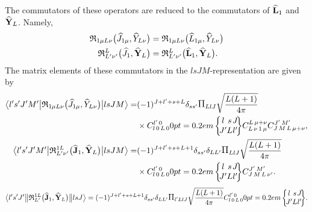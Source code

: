 The commutators of these operators are reduced to the commutators of \(\widehat{\mathbf{L}}_{1}\) and \(\widehat{\mathbf{Y}}_{L}\). Namely,
\begin{align*}
\mathfrak{R}_{1 \mu L \nu}\bigl(\widehat{J}_{1 \mu}, \widehat{Y}_{L \nu}\bigr) & =\mathfrak{R}_{1 \mu L \nu}\bigl(\widehat{L}_{1 \mu}, \widehat{Y}_{L \nu}\bigr) \\
\mathfrak{R}_{L^{\prime} \nu^{\prime}}^{L}\bigl(\widehat{J}_{1}, \widehat{\mathbf{Y}}_{L}\bigr) & =\mathfrak{R}_{L^{\prime} \nu^{\prime}}^{L}\bigl(\widehat{\mathbf{L}}_{1}, \widehat{\mathbf{Y}}_{L}\bigr).
\end{align*}
The matrix elements of these commutators in the $lsJM$-representation are given by
\begin{align}
\braOket{ l^{\prime} s^{\prime} J^{\prime} M^{\prime}}{ \mathfrak{R}_{1 \mu L \nu}\bigl(\widehat{J}_{1 \mu}, \widehat{Y}_{L \nu}\bigr)}{l s J M}=&(-1)^{J+l^{\prime}+s+L} \delta_{s s^{\prime}} \Fact{L l J}\sqrt{\frac{L(L+1)}{4 \pi}}\notag \\
&\times
\clebsch{l}{0}{L}{0}{l^{\prime}}{0}
\sixj{l}{s}{J}{J^{\prime}}{L}{l^{\prime}} 
\clebsch{L}{\nu}{1}{\mu}{L}{\mu+\nu} 
\clebsch{J}{M}{L}{\mu+\nu}{J^{\prime}}{M^{\prime}} , \label{eq:13:2:126}\\
\braOket{ l^{\prime} s^{\prime} J^{\prime} M^{\prime}}{ \mathfrak{R}_{L^{\prime} \nu^{\prime}}^{1 L}\bigl(\widehat{\vect{J}}_{1}, \widehat{\vect{Y}}_{L}\bigr)}{l s J M}=&(-1)^{J+l^{\prime}+s+L+1} \delta_{s s^{\prime}} \delta_{L L^{\prime}} \Fact{L l J}\sqrt{\frac{L(L+1)}{4 \pi}}\notag \\
& \times
\clebsch{l}{0}{L}{0}{l^{\prime}}{0}
\sixj{l}{s}{J}{J^{\prime}}{L}{l^{\prime}} 
\clebsch{J}{M}{L}{\nu^{\prime}}{J^{\prime}}{M^{\prime}}. \label{eq:13:2:127}
\end{align}
\begin{equation*} 
    \braOketred{ l^{\prime} s^{\prime} J^{\prime}}{ \mathfrak{R}_{L^{\prime}}^{1 L}\bigl(\widehat{\vect{J}}_{1}, \widehat{\vect{Y}}_{L}\bigr)}{l s J}=(-1)^{J+l^{\prime}+s+L+1} \delta_{s s^{\prime}} \delta_{L L^{\prime}} \Fact{l^\prime L l J}\sqrt{\frac{L(L+1)}{4 \pi}}
\clebsch{l}{0}{L}{0}{l^{\prime}}{0}
\sixj{l}{s}{J}{J^{\prime}}{L}{l^{\prime}} .
\end{equation*}

